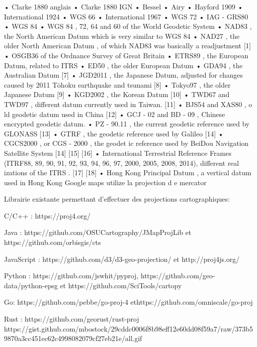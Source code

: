 \documentclass{article}
\begin{document}
•
Clarke 1880 anglais
•
Clarke 1880 IGN
•
Bessel
•
Airy
•
Hayford 1909
•
International 1924
•
WGS 66
•
International 1967
•
WGS 72
•
IAG
-
GRS80
•
WGS 84
•
WGS 84
, 72, 64 and 60 of the
World Geodetic System
•
NAD83
, the
North American Datum
which is very similar to WGS 84
•
NAD27
, the older
North American Datum
, of which NAD83 was basically a 
readjustment
[1]
•
OSGB36
of the
Ordnance Survey
of
Great Britain
•
ETRS89
, the European Datum, related to
ITRS
•
ED50
, the older European Datum
•
GDA94
, the Australian Datum
[7]
•
JGD2011
, the Japanese Datum, adjusted for changes caused by
2011 Tōhoku 
earthquake and tsunami
[8]
•
Tokyo97
, the older Japanese Datum
[9]
•
KGD2002
, the Korean Datum
[10]
•
TWD67
and
TWD97
, different datum currently used in Taiwan.
[11]
•
BJS54
and
XAS80
, o
ld geodetic datum used in China
[12]
•
GCJ
-
02
and
BD
-
09
, Chinese encrypted geodetic datum.
•
PZ
-
90.11
, the current geodetic reference 
used by
GLONASS
[13]
•
GTRF
, the geodetic 
reference used by
Galileo
[14]
•
CGCS2000
, or
CGS
-
2000
, the geodet
ic reference used by
BeiDou Navigation Satellite 
System
[14]
[15]
[16]
•
International Terrestrial Reference Frames
(ITRF88, 89, 90, 91, 92, 93, 94, 96, 97, 2000, 
2005, 2008, 2014), different real
izations of the
ITRS
.
[17]
[18]
•
Hong Kong Principal Datum
, 
a vertical datum used in Hong Kong
Google maps utilize la projection d
e mercator



Librairie existante permettant d’effectuer des projections cartographiques:

C/C++ : https://proj4.org/

Java : https://github.com/OSUCartography/JMapProjLib et https://github.com/orbisgis/cts

JavaScript : https://github.com/d3/d3-geo-projection/ et http://proj4js.org/

Python : https://github.com/jswhit/pyproj, https://github.com/geo-data/python-epsg et https://github.com/SciTools/cartopy

Go: https://github.com/pebbe/go-proj-4 ethttps://github.com/omniscale/go-proj

Rust : https://github.com/georust/rust-proj
https://gist.github.com/mbostock/29cddc0006f8b98eff12e60dd08f59a7/raw/373b59870a3cc451ec62c4998082079cf27eb21e/all.gif
\end{document}
